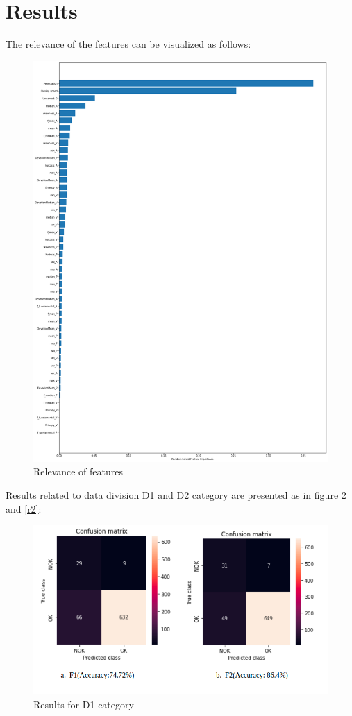  \section{Results} 
 
 The relevance of the features can be visualized as follows:
   \begin{figure}[h]
   	\centering
   	\includegraphics[width=0.62\linewidth]{images/relvance.png}
   	\caption{Relevance of features}
   	\label{n5}
   \end{figure}
Results related to data division D1 and D2 category are presented as in figure \ref{r1} and \ref{r2}:  
      \begin{figure}[b]
      	\centering
      	\includegraphics[width=.9\linewidth]{images/r1.png}
      	\caption{Results for D1 category}
      	\label{r1}
      
      \end{figure}
